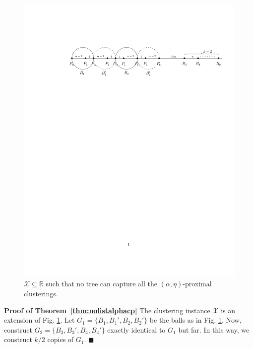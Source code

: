 \documentclass[orivec]{llncs}
\newcommand{\mc}{\mathcal}
\renewcommand{\qed}{\hfill\ensuremath{\blacksquare}}
\begin{document}
\begin{figure}[!t]
\begin{center}
\includegraphics[trim={47mm 205mm 12mm 44mm},clip,width=\textwidth]{lbdFig2.pdf}
\end{center}
\vspace{-1cm}
\caption{$\mc X \subseteq \mathbb{R}$ such that no tree can capture all the $(\alpha, \eta)$-proximal clusterings.}
\label{fig:noalgalphacp}
\end{figure}

\noindent\textbf{Proof of Theorem~\ref{thm:nolistalphacp}}
The clustering instance $\mc X$ is an extension of Fig. \ref{fig:noalgalphacp}. Let  $G_1 = \{B_1, B_1', B_2, B_2'\}$ be the balls as in Fig. \ref{fig:noalgalphacp}. Now, construct $G_2 = \{B_3, B_3', B_4, B_4'\}$ exactly identical to $G_1$ but far. In this way, we construct $k/2$ copies of $G_1$. \qed\\
\end{document}
